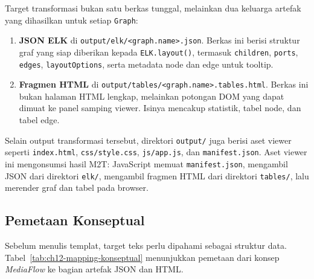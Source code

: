 Target transformasi bukan satu berkas tunggal, melainkan dua keluarga artefak yang dihasilkan untuk setiap \texttt{Graph}:
\begin{enumerate}
  \item \textbf{JSON ELK} di \texttt{output/elk/<graph.name>.json}. Berkas ini berisi struktur graf yang siap diberikan kepada \texttt{ELK.layout()}, termasuk \texttt{children}, \texttt{ports}, \texttt{edges}, \texttt{layoutOptions}, serta metadata node dan edge untuk tooltip.
  \item \textbf{Fragmen HTML} di \texttt{output/tables/<graph.name>.tables.html}. Berkas ini bukan halaman HTML lengkap, melainkan potongan DOM yang dapat dimuat ke panel samping viewer. Isinya mencakup statistik, tabel node, dan tabel edge.
\end{enumerate}

Selain output transformasi tersebut, direktori \texttt{output/} juga berisi aset viewer seperti \texttt{index.html}, \texttt{css/style.css}, \texttt{js/app.js}, dan \texttt{manifest.json}. Aset viewer ini mengonsumsi hasil M2T: JavaScript memuat \texttt{manifest.json}, mengambil JSON dari direktori \texttt{elk/}, mengambil fragmen HTML dari direktori \texttt{tables/}, lalu merender graf dan tabel pada browser.

\subsection{Pemetaan Konseptual}

Sebelum menulis templat, target teks perlu dipahami sebagai struktur data. Tabel~\ref{tab:ch12-mapping-konseptual} menunjukkan pemetaan dari konsep \textit{MediaFlow} ke bagian artefak JSON dan HTML.


